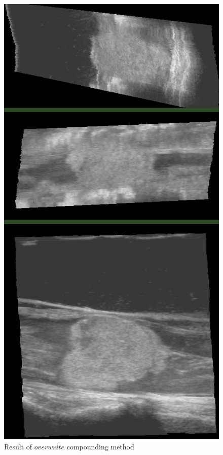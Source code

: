 \begin{figure}
\begin{minipage}[b]{0.326\textwidth}
	\centering
	\includegraphics[width=\textwidth]{graphics/large_overwrite.png}
	\caption{Result of $overwrite$ compounding method}

\end{minipage}
\end{figure}
